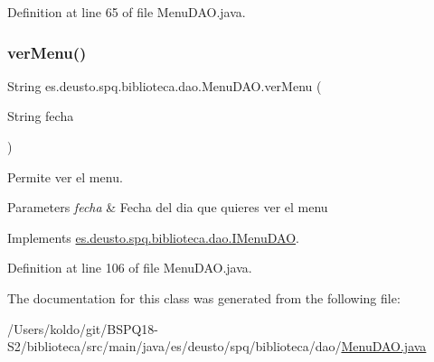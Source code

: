 Definition at line 65 of file Menu\+D\+A\+O.\+java.

\mbox{\label{classes_1_1deusto_1_1spq_1_1biblioteca_1_1dao_1_1_menu_d_a_o_ae05c2b05b530f98bcfc8ad1146f4efd7}} 
\subsubsection{\texorpdfstring{ver\+Menu()}{verMenu()}}
{\footnotesize\ttfamily String es.\+deusto.\+spq.\+biblioteca.\+dao.\+Menu\+D\+A\+O.\+ver\+Menu (\begin{DoxyParamCaption}\item[{String}]{fecha }\end{DoxyParamCaption})}

Permite ver el menu. 
\begin{DoxyParams}{Parameters}
{\em fecha} & Fecha del dia que quieres ver el menu \\
\hline
\end{DoxyParams}


Implements \mbox{\hyperlink{interfacees_1_1deusto_1_1spq_1_1biblioteca_1_1dao_1_1_i_menu_d_a_o_ac92176efdcf5f320225152392db8cb8a}{es.\+deusto.\+spq.\+biblioteca.\+dao.\+I\+Menu\+D\+AO}}.



Definition at line 106 of file Menu\+D\+A\+O.\+java.



The documentation for this class was generated from the following file\+:\begin{DoxyCompactItemize}
\item 
/\+Users/koldo/git/\+B\+S\+P\+Q18-\/\+S2/biblioteca/src/main/java/es/deusto/spq/biblioteca/dao/\mbox{\hyperlink{_menu_d_a_o_8java}{Menu\+D\+A\+O.\+java}}\end{DoxyCompactItemize}
